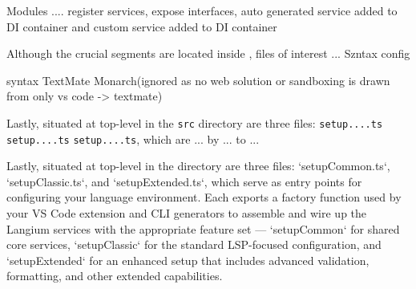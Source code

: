 Modules  .... register services, expose interfaces, auto generated service added to DI container and custom service added to DI container

Although the crucial segments are located inside , files of interest ... Szntax config

syntax TextMate Monarch(ignored as no web solution or sandboxing is drawn from only vs code -> textmate)

Lastly, situated at top-level in the \verb|src| directory are three files: \verb|setup....ts| \verb|setup....ts| \verb|setup....ts|, which are ...
by ... to ...


Lastly, situated at top-level in the  directory are three files: `setupCommon.ts`, `setupClassic.ts`, and `setupExtended.ts`, which serve as entry points for configuring your language environment. Each exports a factory function used by your VS Code extension and CLI generators to assemble and wire up the Langium services with the appropriate feature set — `setupCommon` for shared core services, `setupClassic` for the standard LSP-focused configuration, and `setupExtended` for an enhanced setup that includes advanced validation, formatting, and other extended capabilities.


